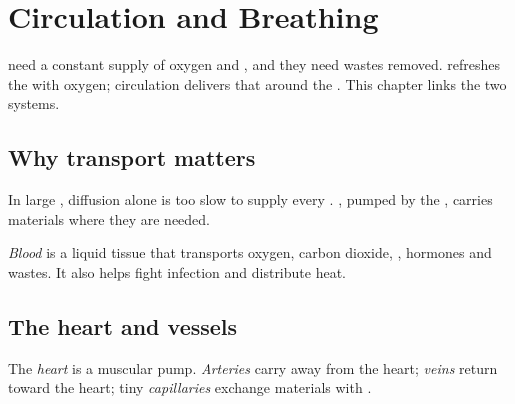 \chapter{Circulation and Breathing}\label{ch:g5:circulation}

 need a constant supply of oxygen and , and they need
wastes removed.  refreshes the  with oxygen; circulation
delivers that  around the . This chapter links the two systems.

\section{Why transport matters}

\begin{proposition}\label{prop:g5:circulation:need}
In large , diffusion alone is too slow to supply every .
, pumped by the , carries materials where they are needed.
\end{proposition}
\admitted

\begin{definition}[Blood]\label{def:g5:circulation:blood}
\emph{Blood} is a liquid tissue that transports oxygen,
carbon dioxide, , hormones and wastes. It also helps fight
infection and distribute heat.
\end{definition}

\section{The heart and vessels}

\begin{definition}\label{def:g5:circulation:heart}
The \emph{heart} is a muscular pump. \emph{Arteries}
 carry  away from the heart; \emph{veins}
return  toward the heart; tiny \emph{capillaries}
exchange materials with  .
\end{definition}

